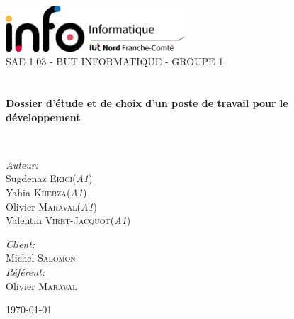 \begin{titlepage}
\begin{center}

\includegraphics[width=0.5\textwidth]{./images/InfoLogoQuadriH.png}~\\[1cm]

\textsc{\LARGE SAE 1.03 - BUT INFORMATIQUE - GROUPE 1}\\[1.5cm]

\textsc{\Large }\\[0.5cm]

\HRule \\[0.4cm]

{\huge \bfseries Dossier d'étude et de choix d'un poste de travail pour le développement\\[0.4cm] }

\HRule \\[1.5cm]

\begin{minipage}{0.4\textwidth}
\begin{flushleft} \large
\emph{Auteur:}\\
Sugdenaz \textsc{Ekici}(\textit{A1})\\
Yahia \textsc{Kherza}(\textit{A1})\\
Olivier \textsc{Maraval}(\textit{A1})\\
Valentin \textsc{Viret-Jacquot}(\textit{A1})
\end{flushleft}
\end{minipage}
\begin{minipage}{0.4\textwidth}
\begin{flushright} \large
\emph{Client:} \\
Michel \textsc{Salomon}\\
\emph{Référent:} \\
Olivier \textsc{Maraval}
\end{flushright}
\end{minipage}

\vfill

{\large \today}

\end{center}
\end{titlepage}